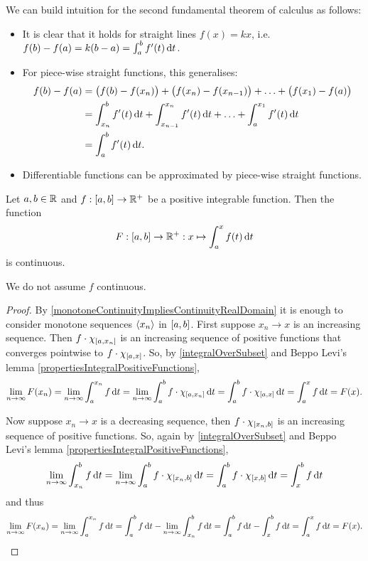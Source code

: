 \begin{note}
We can build intuition for the second fundamental theorem of calculus as follows:
\begin{itemize}
\item It is clear that it holds for straight lines $f(x) = kx$, i.e. $f(b)-f(a) = k(b-a) = \int_a^b f'(t)\operatorname{d \!}{t}$.
\item For piece-wise straight functions, this generalises:
\begin{align*}
f(b) - f(a) &= \big(f(b) - f(x_n)\big) + \big(f(x_n) - f(x_{n-1})\big) + \ldots + \big(f(x_1) - f(a)\big) \\
&= \int_{x_n}^b f'(t)\operatorname{d \!}{t} + \int^{x_n}_{x_{n-1}} f'(t)\operatorname{d \!}{t} + \ldots + \int_a^{x_1} f'(t)\operatorname{d \!}{t} \\
&= \int_a^b f'(t)\operatorname{d \!}{t}.
\end{align*}
\item Differentiable functions can be approximated by piece-wise straight functions.
\end{itemize}
\end{note}

\begin{proposition} \label{integralPositiveFunctionContinuous}
Let $a,b\in \mathbb{R}$ and $f: \interval{a,b}\to \R^+$ be a positive integrable function. Then the function
\[ F: \interval{a,b} \to \R^+: x\mapsto \int_a^x f(t)\diff{t} \]
is continuous.
\end{proposition}
We do not assume $f$ continuous.
\begin{proof}
By \ref{monotoneContinuityImpliesContinuityRealDomain} it is enough to consider monotone sequences $\left\langle x_n \right\rangle$ in $\interval{a,b}$. First suppose $x_n\to x$ is an increasing sequence. Then $f\cdot \charFunc{\interval{a,x_n}}$ is an increasing sequence of positive functions that converges pointwise to $f\cdot \charFunc{\interval{a,x}}$. So, by \ref{integralOverSubset} and Beppo Levi's lemma \ref{propertiesIntegralPositiveFunctions},
\[ \lim_{n\to\infty} F(x_n) = \lim_{n\to\infty}\int_a^{x_n}f\diff{t} = \lim_{n\to\infty}\int_a^{b}f\cdot \charFunc{\interval{a,x_n}}\diff{t} = \int_a^{b}f\cdot \charFunc{\interval{a,x}}\diff{t} = \int_a^{x}f\diff{t} = F(x). \]

Now suppose $x_n\to x$ is a decreasing sequence, then $f\cdot\charFunc{\interval{x_n,b}}$ is an increasing sequence of positive functions. So, again by \ref{integralOverSubset} and Beppo Levi's lemma \ref{propertiesIntegralPositiveFunctions},
\[ \lim_{n\to\infty}\int_{x_n}^b f\diff{t} = \lim_{n\to\infty}\int_{a}^b f\cdot\charFunc{\interval{x_n, b}}\diff{t} = \int_a^b f\cdot \charFunc{\interval{x,b}}\diff{t} = \int_x^b f\diff{t} \]
and thus
\[ \lim_{n\to\infty} F(x_n) = \lim_{n\to\infty}\int_a^{x_n}f\operatorname{d \!}{t} = \int_a^b f \operatorname{d \!}{t} - \lim_{n\to\infty}\int_{x_n}^b f\operatorname{d \!}{t} = \int_a^b f \operatorname{d \!}{t} - \int_x^b f\operatorname{d \!}{t} = \int_a^x f \operatorname{d \!}{t} = F(x). \]
\end{proof}

